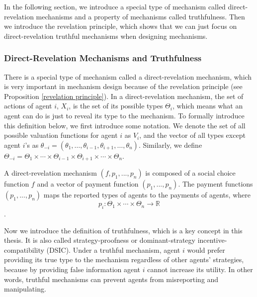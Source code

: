 \documentclass[11pt]{phdthesis}
\begin{document}
In the following section, we introduce a special type of mechanism called direct-revelation mechanisms and a property of mechanisms called truthfulness. Then we introduce the revelation principle, which shows that we can just focus on direct-revelation truthful mechanisms when designing mechanisms.

\subsubsection{Direct-Revelation Mechanisms and Truthfulness} \label{direct-revelation mechanisms and truthfulness}
There is a special type of mechanism called a direct-revelation mechanism, which is very important in mechanism design because of the revelation principle (see Proposition \ref{revelation principle}). In a direct-revelation mechanism, the set of actions of agent $i$, $X_i$, is the set of its possible types $ \Theta_i $, which means what an agent can do is just to reveal its type to the mechanism.  To formally introduce this definition below, we first introduce some notation. We denote the set of all possible valuation functions for agent $i$ as $V_i$, and the vector of all types except agent $i$'s as $\theta_{-i} = (\theta_1,\ldots,\theta_{i-1},\theta_{i+1},\ldots,\theta_n)$. Similarly, we define $\Theta_{-i} = \Theta_1 \times \cdots \times \Theta_{i-1} \times \Theta_{i+1} \times \cdots \times \Theta_n$.

\begin{definition} 
	A direct-revelation mechanism $(f,p_1,...,p_n)$ is composed of a social choice function $f$ and a vector of payment function $(p_1,...,p_n)$.
	The payment functions $(p_1,...,p_n)$ maps the reported types of agents to the payments of agents, where
	$$p_i : \Theta_1 \times \cdots \times \Theta_n \rightarrow \mathbb{R}$$
	\citep[Definition 9.14]{nisan2007algorithmic}.
\end{definition}

Now we introduce the definition of truthfulness, which is a key concept in this thesis. It is also called strategy-proofness or dominant-strategy incentive-compatibility (DSIC). Under a truthful mechanism, agent $i$ would prefer providing its true type to the mechanism regardless of other agents' strategies, because by providing false information agent $i$ cannot increase its utility. In other words, truthful mechanisms can prevent agents from misreporting and manipulating.
\end{document}
